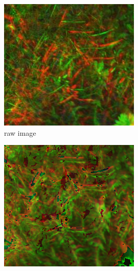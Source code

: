 \documentclass[]{elsarticle}
\begin{document}
	\begin{figure}[ht]
		\centering
		
		\begin{subfigure}[b]{0.2\textwidth}
			\centering
			\includegraphics[width=\linewidth]{../figures/results-uncorrected}
			\caption{raw image}
			\label{fig:merged-correction-uncorrected}
		\end{subfigure}
		\begin{subfigure}[b]{0.2\textwidth}
			\centering
			\includegraphics[width=\linewidth]{../figures/results-manufacturer}

\end{subfigure}
\end{figure}
\end{document}
